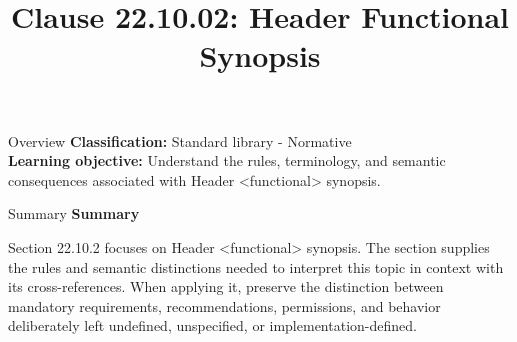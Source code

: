 \documentclass[10pt,letterpaper]{article}
\title{Clause 22.10.02: Header Functional Synopsis}
\author{}
\date{}
\begin{document}
\maketitle
\begin{CornellOverviewBox}{Overview}
\textbf{Classification:} Standard library - Normative\\[2pt]
\textbf{Learning objective:} Understand the rules, terminology, and semantic consequences associated with Header <functional> synopsis.
\end{CornellOverviewBox}\begin{CornellSummaryBox}{Summary}
{\sffamily\bfseries\color{Accent} Summary}\par\vspace{3pt}Section 22.10.2 focuses on Header <functional> synopsis. The section supplies the rules and semantic distinctions needed to interpret this topic in context with its cross-references. When applying it, preserve the distinction between mandatory requirements, recommendations, permissions, and behavior deliberately left undefined, unspecified, or implementation-defined.
\end{CornellSummaryBox}
\end{document}

